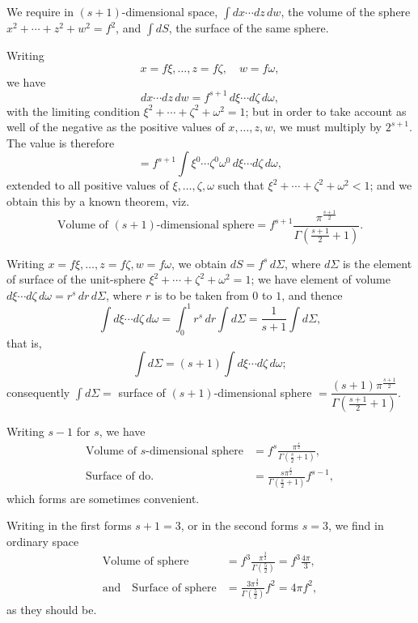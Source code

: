 \documentclass[11pt,a4paper]{book}
\begin{document}
\begin{art}\label{art:51}
We require in $(s+1)$-dimensional space, $\int dx \cdots dz \, dw$, the volume of the sphere $x^2 + \cdots + z^2 + w^2 = f^2$, and $\int dS$, the surface of the same sphere.

Writing
\[
x = f\xi, \ldots, z = f\zeta, \quad w = f\omega,
\]
we have
\[
dx \cdots dz \, dw = f^{s+1} \, d\xi \cdots d\zeta \, d\omega,
\]
with the limiting condition $\xi^2 + \cdots + \zeta^2 + \omega^2 = 1$; but in order to take account as well of the negative as the positive values of $x, \ldots, z, w$, we must multiply by $2^{s+1}$. The value is therefore
\[
= f^{s+1} \int \xi^0 \cdots \zeta^0 \omega^0 \, d\xi \cdots d\zeta \, d\omega,
\]
extended to all positive values of $\xi, \ldots, \zeta, \omega$ such that $\xi^2 + \cdots + \zeta^2 + \omega^2 < 1$; and we obtain this by a known theorem, viz.
\[
\text{Volume of $(s+1)$-dimensional sphere} = f^{s+1} \frac{\pi^{\frac{s+1}{2}}}{\Gamma(\frac{s+1}{2} + 1)}.
\]

Writing $x = f\xi, \ldots, z = f\zeta, w = f\omega$, we obtain $dS = f^s \, d\Sigma$, where $d\Sigma$ is the element of surface of the unit-sphere $\xi^2 + \cdots + \zeta^2 + \omega^2 = 1$; we have element of volume $d\xi \cdots d\zeta \, d\omega = r^s \, dr \, d\Sigma$, where $r$ is to be taken from $0$ to $1$, and thence
\[
\int d\xi \cdots d\zeta \, d\omega = \int_0^1 r^s \, dr \int d\Sigma = \frac{1}{s+1} \int d\Sigma,
\]
that is,
\[
\int d\Sigma = (s+1) \int d\xi \cdots d\zeta \, d\omega;
\]
consequently $\int d\Sigma = $ surface of $(s+1)$-dimensional sphere $= \dfrac{(s+1)\pi^{\frac{s+1}{2}}}{\Gamma(\frac{s+1}{2} + 1)}$.
\end{art}

\begin{art}\label{art:52}
Writing $s-1$ for $s$, we have
\begin{align*}
\text{Volume of $s$-dimensional sphere} &= f^s \frac{\pi^{\frac{s}{2}}}{\Gamma(\frac{s}{2} + 1)}, \\
\text{Surface of do.} &= \frac{s\pi^{\frac{s}{2}}}{\Gamma(\frac{s}{2} + 1)} f^{s-1},
\end{align*}
which forms are sometimes convenient.

Writing in the first forms $s+1 = 3$, or in the second forms $s = 3$, we find in ordinary space
\begin{align*}
\text{Volume of sphere} &= f^3 \frac{\pi^{\frac{3}{2}}}{\Gamma(\frac{5}{2})} = f^3 \frac{4\pi}{3}, \\
\text{and} \quad \text{Surface of sphere} &= \frac{3\pi^{\frac{3}{2}}}{\Gamma(\frac{5}{2})} f^2 = 4\pi f^2,
\end{align*}
as they should be.
\end{art}
\end{document}
